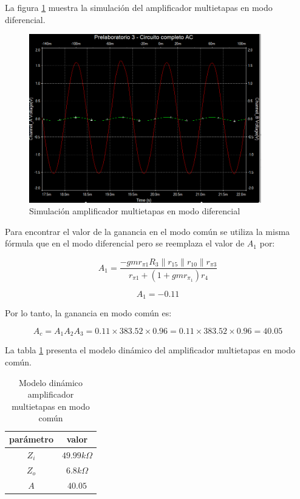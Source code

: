 La figura \ref{fig:sim-amp-multietapas-mod-diferencial} muestra la simulación del amplificador multietapas en modo diferencial.

\begin{figure}[ht]
    \centering
    \includegraphics[width=0.9\textwidth]{src/images/p3/multietapa-modo-diff-ganancia.png}
    \caption{Simulación amplificador multietapas en modo diferencial}
    \label{fig:sim-amp-multietapas-mod-diferencial} 
\end{figure}

Para encontrar el valor de la ganancia en el modo común se utiliza la misma fórmula que en el modo diferencial pero se reemplaza el valor de $A_1$ por:

$$ A_1 = \frac{-gmr_{\pi1} R_3 \parallel r_{15} \parallel r_{10} \parallel r_{\pi3}}{r_{\pi1} + (1+ gmr_{\pi_1})r_4}$$

$$ A_1 = -0.11 $$

Por lo tanto, la ganancia en modo común es:

$$ A_c = A_1 A_2 A_3 = 0.11 \times 383.52 \times 0.96 = 0.11 \times 383.52 \times 0.96 = 40.05 $$

La tabla \ref{tab:met-amp-multietapas-mod-comun} presenta el modelo dinámico del amplificador multietapas en modo común.

\begin{table}[ht]
    \centering
    \begin{tabular}{|c|c|}
        \hline
        parámetro & valor  \\
        \hline
        $Z_i$ & $49.99k\Omega$ \\
        \hline
        $Z_o$ & $6.8k\Omega$ \\
        \hline
        $A$ & $40.05$ \\
        \hline
    \end{tabular}
    \caption{Modelo dinámico amplificador multietapas en modo común}
    \label{tab:met-amp-multietapas-mod-comun}
\end{table}

